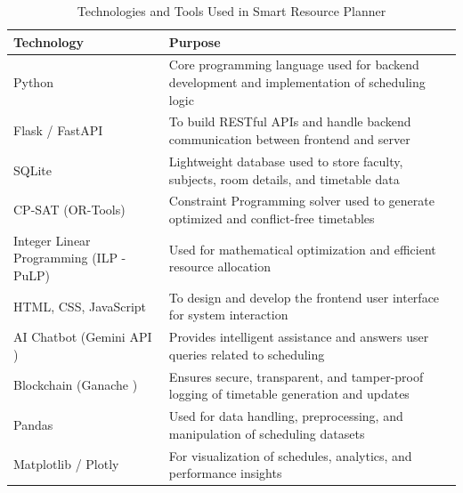 \documentclass[a4paper, 12pt]{report}
\begin{document}





\begin{table}[H]
\caption{Technologies and Tools Used in Smart Resource Planner}
\centering
\renewcommand{\arraystretch}{1.2}

\begin{tabular}{|p{6cm}|p{9cm}|}
\hline
\textbf{Technology} & \textbf{Purpose} \\ \hline

Python & Core programming language used for backend development and implementation of scheduling logic \\ \hline

Flask / FastAPI & To build RESTful APIs and handle backend communication between frontend and server \\ \hline

SQLite & Lightweight database used to store faculty, subjects, room details, and timetable data \\ \hline

CP-SAT (OR-Tools) & Constraint Programming solver used to generate optimized and conflict-free timetables \\ \hline

Integer Linear Programming (ILP - PuLP) & Used for mathematical optimization and efficient resource allocation \\ \hline

HTML, CSS, JavaScript & To design and develop the frontend user interface for system interaction \\ \hline

AI Chatbot (Gemini API ) & Provides intelligent assistance and answers user queries related to scheduling \\ \hline

Blockchain (Ganache ) & Ensures secure, transparent, and tamper-proof logging of timetable generation and updates \\ \hline

Pandas & Used for data handling, preprocessing, and manipulation of scheduling datasets \\ \hline

Matplotlib / Plotly & For visualization of schedules, analytics, and performance insights \\ \hline

\end{tabular}
\end{table}
\end{document}
